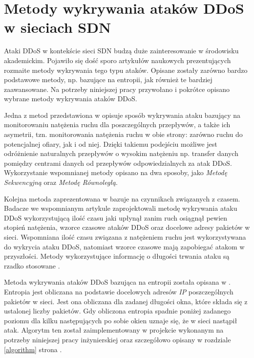 \section{Metody wykrywania ataków DDoS w sieciach SDN}

Ataki DDoS w kontekście sieci SDN budzą duże zainteresowanie w środowisku
akademickim. Pojawiło się dość sporo artykułów naukowych prezentujących rozmaite
metody wykrywania tego typu ataków. Opisane zostały zarówno bardzo podstawowe
metody, np. bazujące na entropii, jak również te bardziej zaawansowane. Na potrzeby
niniejszej pracy przywołano i pokrótce opisano wybrane metody wykrywania
ataków DDoS. 

Jedna z metod przedstawiona w \cite{ddosNYarticle} opisuje sposób wykrywania
ataku bazujący na monitorowaniu natężenia ruchu dla poszczególnych przepływów, a
także ich asymetrii, tzn. monitorowania natężenia ruchu w obie strony: zarówno
ruchu do potencjalnej ofiary, jak i od niej. Dzięki takiemu podejściu możliwe
jest odróżnienie naturalnych przepływów o wysokim natężeniu np. transfer danych
pomiędzy centrami danych od przepływów odpowiedzialnych za atak DDoS.
Wykorzystanie wspomnianej metody opisano na dwa sposoby, jako \textit{Metodę
  Sekwencyjną} oraz \textit{Metodę Równoległą}. 

Kolejna metoda zaprezentowana w \cite{ddoskoreaarticle} bazuje na czynnikach
związanych z czasem. Badacze we wspomnianym artykule zaprojektowali metodę
wykrywania ataku DDoS wykorzystującą ilość czasu jaki upłynął zanim ruch
osiągnął pewien stopień natężenia, wzorce czasowe ataków DDoS oraz docelowe
adresy pakietów w sieci. Wspomniana ilość czasu związana z natężeniem ruchu jest
wykorzystywana do wykrycia ataku DDoS, natomiast wzorce czasowe mają zapobiegać
atakom w przyszłości. Metody wykorzystujące informację o długości trwania ataku
są rzadko stosowane \cite{ddoskoreaarticle}. 

Metoda wykrywania ataków DDoS bazująca na entropii została opisana w
\cite{mainddosarticle}. Entropia jest obliczana na podstawie docelowych adresów
\textit{IP} poszczególnych pakietów w sieci. Jest ona obliczana dla zadanej
długości okna, które składa się z ustalonej liczby pakietów. Gdy obliczona
entropia spadnie poniżej zadanego poziomu dla kilku następujących po sobie okien
uznaje się, że w sieci nastąpił atak. Algorytm ten został zaimplementowany w
projekcie wykonanym na potrzeby niniejszej pracy inżynierskiej oraz szczegółowo
opisany w rozdziale \ref{algorithm} strona \pageref{algorithm}.

